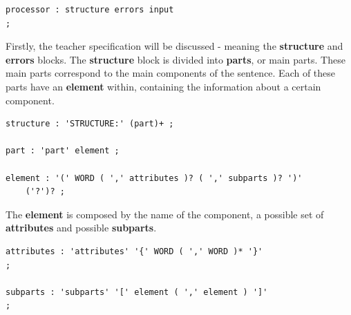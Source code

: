 \begin{center}
\begin{minipage}{8cm}
\begin{Verbatim}[frame=single, framesep=2mm]
processor : structure errors input
;
\end{Verbatim}
\end{minipage}
\end{center}

Firstly, the teacher specification will be discussed - meaning the \textbf{structure} and \textbf{errors} blocks.
The \textbf{structure} block is divided into \textbf{parts}, or main parts. These main parts correspond to the main components of the sentence. Each of these parts have an \textbf{element} within, containing the information about a certain component.

\begin{Verbatim}[frame=single, framesep=2mm]
structure : 'STRUCTURE:' (part)+ ;

part : 'part' element ;

element : '(' WORD ( ',' attributes )? ( ',' subparts )? ')' 
    ('?')? ;
\end{Verbatim}


The \textbf{element} is composed by the name of the component, a possible set of \textbf{attributes} and possible \textbf{subparts}.

\begin{center}
\begin{minipage}{12cm}
\begin{Verbatim}[frame=single, framesep=2mm]
attributes : 'attributes' '{' WORD ( ',' WORD )* '}'
;

subparts : 'subparts' '[' element ( ',' element ) ']'
;
\end{Verbatim}
\end{minipage}
\end{center}



